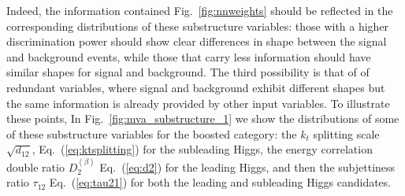 Indeed, the information contained Fig.~\ref{fig:nnweights} should be
reflected in the corresponding distributions of these substructure
variables: those with a higher discrimination power should show
clear differences in shape between the signal and background events,
while those that carry less information should have similar
shapes for signal and background.
%
The third possibility is that of of redundant variables, where signal
and background exhibit different shapes but the same information
is already provided by other input variables.
%
To illustrate these points,
In Fig.~\ref{fig:mva_substructure_1}
we show the distributions of some of
these substructure variables for the boosted category: the
$k_t$ splitting scale $\sqrt{d_{12}}$, Eq.~(\ref{eq:ktsplitting}) for
the subleading Higgs,
the energy correlation double ratio $D_2^{(\beta)}$
Eq.~(\ref{eq:d2}) for the leading Higgs,
and then 
the subjettiness ratio $\tau_{12}$
Eq.~(\ref{eq:tau21})
for both the leading and subleading Higgs candidates.
%

